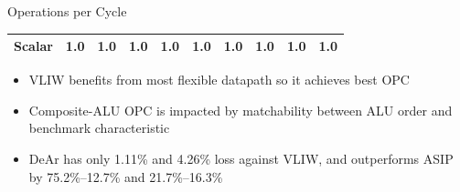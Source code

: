 \documentclass{beamer}
\begin{document}
\begin{CJK}{UTF8}{bkai}
\begin{frame}{Operations per Cycle}
\begin{table}[!ht]
{\begin{tabular}{|c|c|c|c|c|c|c|c|c|c|}
                            Scalar  & 1.0  & 1.0  & 1.0  & 1.0  & 1.0  & 1.0  & 1.0  & 1.0  & 1.0 \\ \hline 
                        \end{tabular}
                    }
                \end{table}
                \vspace{-1em}
                \begin{itemize}
                    \item <2->{VLIW benefits from most flexible datapath so it achieves best OPC}
                    \item <3->{Composite-ALU OPC is impacted by matchability between ALU order and benchmark characteristic}
                    \item <4->{DeAr has only 1.11\% and 4.26\% loss against VLIW, 
                        and outperforms ASIP by 75.2\%--12.7\% and 21.7\%--16.3\%}
                \end{itemize}

            \end{frame}


\end{CJK}
\end{document}
